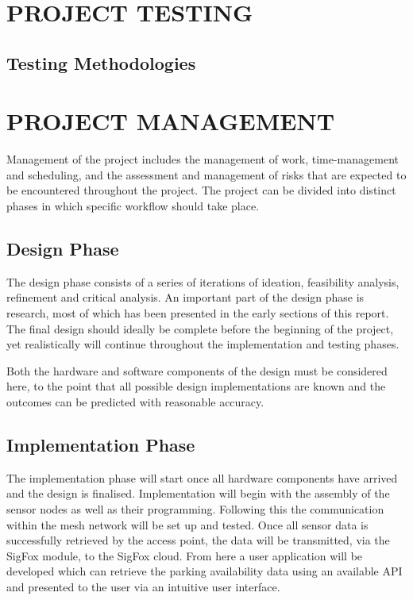\documentclass[10pt,twocolumn]{witseiepaper}
\begin{document}
\section{PROJECT TESTING}
	\subsection{Testing Methodologies}


\section{PROJECT MANAGEMENT}

	Management of the project includes the management of work, time-management and scheduling, and the assessment and management of risks that are expected to be encountered throughout the project. The project can be divided into distinct phases in which specific workflow should take place.
	
	\subsection{Design Phase}
		The design phase consists of a series of iterations of ideation, feasibility analysis, refinement and critical analysis. An important part of the design phase is research, most of which has been presented in the early sections of this report. The final design should ideally be complete before the beginning of the project, yet realistically will continue throughout the implementation and testing phases. 
		
		Both the hardware and software components of the design must be considered here, to the point that all possible design implementations are known and the outcomes can be predicted with reasonable accuracy. 
	
	\subsection{Implementation Phase}
		The implementation phase will start once all hardware components have arrived and the design is finalised. Implementation will begin with the assembly of the sensor nodes as well as their programming. Following this the communication within the mesh network will be set up and tested. Once all sensor data is successfully retrieved by the access point, the data will be transmitted, via the SigFox module, to the SigFox cloud. From here a user application will be developed which can retrieve the parking availability data using an available API and presented to the user via an intuitive user interface.
	
\end{document}
